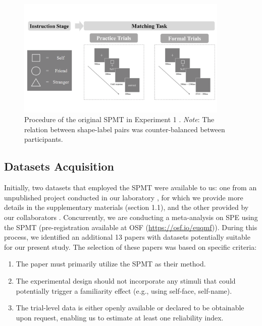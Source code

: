 \documentclass[sn-apa]{sn-jnl}%
\theoremstyle{thmstyleone}%
\theoremstyle{thmstyletwo}%
\theoremstyle{thmstylethree}%
\begin{document}
\begin{figure}[!htbp]
	\centering
	\includegraphics[width=0.9\textwidth]{./Figure/Fig_1_exp_pro.png}
	\caption{Procedure of the original SPMT in Experiment 1 \parencite{sui2012perceptual}. \textit{Note}: The relation between shape-label pairs was counter-balanced between participants.
	}\label{fig:SPMT_procedure}
\end{figure}

\subsection{Datasets Acquisition}\label{subsec:dataset}

Initially, two datasets that employed the SPMT were available to us: one from an unpublished project conducted in our laboratory \parencite{hu2023data}, for which we provide more details in the supplementary materials (section 1.1), and the other provided by our collaborators \parencite{liu2023to}. Concurrently, we are conducting a meta-analysis on SPE using the SPMT (pre-registration available at OSF (\url{https://osf.io/euqmf})). During this process, we identified an additional 13 papers with datasets potentially suitable for our present study. The selection of these papers was based on specific criteria:

\begin{enumerate}[label=\arabic*)]
	\item The paper must primarily utilize the SPMT as their method.
	\item The experimental design should not incorporate any stimuli that could potentially trigger a familiarity effect (e.g., using self-face, self-name).
	\item The trial-level data is either openly available or declared to be obtainable upon request, enabling us to estimate at least one reliability index.
\end{enumerate}
\end{document}
